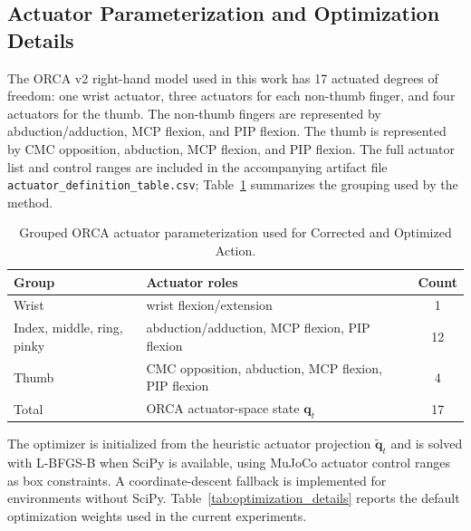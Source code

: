 \documentclass[11pt]{article}
\begin{document}
\subsection{Actuator Parameterization and Optimization Details}
The ORCA v2 right-hand model used in this work has 17 actuated degrees of freedom: one wrist actuator, three actuators for each non-thumb finger, and four actuators for the thumb. The non-thumb fingers are represented by abduction/adduction, MCP flexion, and PIP flexion. The thumb is represented by CMC opposition, abduction, MCP flexion, and PIP flexion. The full actuator list and control ranges are included in the accompanying artifact file \texttt{actuator\_definition\_table.csv}; Table~\ref{tab:actuator_groups} summarizes the grouping used by the method.

\begin{table}[t]
\centering
\caption{Grouped ORCA actuator parameterization used for Corrected and Optimized Action.}
\label{tab:actuator_groups}
\footnotesize
\begin{tabular}{@{}llc@{}}
\toprule
Group & Actuator roles & Count \\
\midrule
Wrist & wrist flexion/extension & 1 \\
Index, middle, ring, pinky & abduction/adduction, MCP flexion, PIP flexion & 12 \\
Thumb & CMC opposition, abduction, MCP flexion, PIP flexion & 4 \\
\midrule
Total & ORCA actuator-space state $\mathbf{q}_t$ & 17 \\
\bottomrule
\end{tabular}
\end{table}

The optimizer is initialized from the heuristic actuator projection $\tilde{\mathbf{q}}_t$ and is solved with L-BFGS-B when SciPy is available, using MuJoCo actuator control ranges as box constraints. A coordinate-descent fallback is implemented for environments without SciPy. Table~\ref{tab:optimization_details} reports the default optimization weights used in the current experiments.
\end{document}
